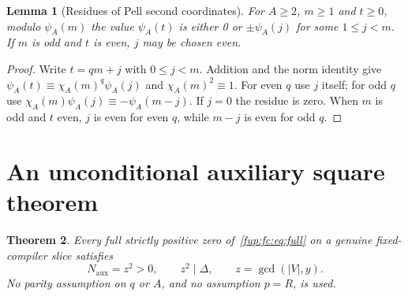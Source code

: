 \documentclass[11pt,letterpaper]{article}
\newtheorem{theorem}{Theorem}[section]
\newtheorem{lemma}[theorem]{Lemma}
\theoremstyle{definition}\newtheorem{definition}[theorem]{Definition}
\theoremstyle{remark}\newtheorem{remark}[theorem]{Remark}
\newcommand{\D}{\Delta}
\newcommand{\ch}[2]{\chi_{#1}(#2)}\newcommand{\ps}[2]{\psi_{#1}(#2)}
\newcommand{\Na}{N_{\mathrm{aux}}}\newcommand{\Nk}{N_{\mathrm{index}}}\newcommand{\Nt}{N_{\mathrm{transport}}}
\begin{document}
\begin{lemma}[Residues of Pell second coordinates]\label{fup:fc:lem:residue}
For $A\ge2$, $m\ge1$ and $t\ge0$, modulo $\ps A m$ the value $\ps A t$
is either 0 or $\pm\ps A j$ for some $1\le j<m$. If $m$ is odd and
$t$ is even, $j$ may be chosen even.
\end{lemma}
\begin{proof}
Write $t=qm+j$ with $0\le j<m$. Addition and the norm identity give
$\ps A t\equiv\ch A m^q\ps A j$ and $\ch A m^2\equiv1$.
For even $q$ use $j$ itself; for odd $q$ use
$\ch A m\ps A j\equiv-\ps A {m-j}$. If $j=0$ the residue is zero.
When $m$ is odd and $t$ even, $j$ is even for even $q$, while $m-j$
is even for odd $q$.
\end{proof}

\section{An unconditional auxiliary square theorem}
\label{fup:fc:sec:aux}
\begin{theorem}\label{fup:fc:thm:aux}
Every full strictly positive zero of~\eqref{fup:fc:eq:full} on a genuine
fixed-compiler slice satisfies
\[
 \Na=z^2>0,\qquad z^2\mid\D,\qquad z=\gcd(|V|,y).
\]
No parity assumption on $q$ or $A$, and no assumption $p=R$, is used.
\end{theorem}
\end{document}

